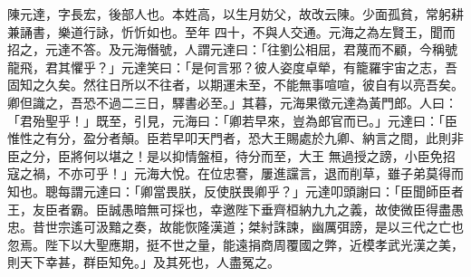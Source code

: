 \begin{pinyinscope}
 陳元達，字長宏，後部人也。本姓高，以生月妨父，故改云陳。少面孤貧，常躬耕兼誦書，樂道行詠，忻忻如也。至年
 四十，不與人交通。元海之為左賢王，聞而招之，元達不答。及元海僭號，人謂元達曰：「往劉公相屈，君蔑而不顧，今稱號龍飛，君其懼乎？」元達笑曰：「是何言邪？彼人姿度卓犖，有籠羅宇宙之志，吾固知之久矣。然往日所以不往者，以期運未至，不能無事喧喧，彼自有以亮吾矣。卿但識之，吾恐不過二三日，驛書必至。」其暮，元海果徵元達為黃門郎。人曰：「君殆聖乎！」既至，引見，元海曰：「卿若早來，豈為郎官而已。」元達曰：「臣惟性之有分，盈分者顛。臣若早叩天門者，恐大王賜處於九卿、納言之間，此則非臣之分，臣將何以堪之！是以抑情盤桓，待分而至，大王
 無過授之謗，小臣免招寇之禍，不亦可乎！」元海大悅。在位忠謇，屢進讜言，退而削草，雖子弟莫得而知也。聰每謂元達曰：「卿當畏朕，反使朕畏卿乎？」元達叩頭謝曰：「臣聞師臣者王，友臣者霸。臣誠愚暗無可採也，幸邀陛下垂齊桓納九九之義，故使微臣得盡愚忠。昔世宗遙可汲黯之奏，故能恢隆漢道；桀紂誅諫，幽厲弭謗，是以三代之亡也忽焉。陛下以大聖應期，挺不世之量，能遠捐商周覆國之弊，近模孝武光漢之美，則天下幸甚，群臣知免。」及其死也，人盡冤之。



\end{pinyinscope}